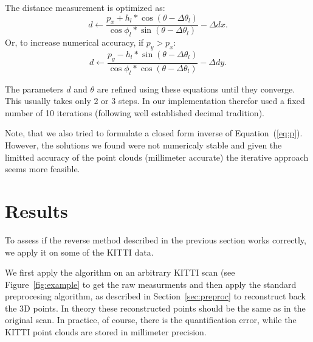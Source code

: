 \documentclass[english]{article}
\begin{document}
The distance measurement is optimized as:
\begin{equation}
    d \leftarrow \frac{p_x + h_l * \cos(\theta - \Delta \theta_l)}{\cos{\phi_l} * \sin(\theta - \Delta \theta_l)} - \Delta dx.  \label{eq:dita}
\end{equation}
Or, to increase numerical accuracy, if $p_y > p_x$:
\begin{equation}
    d \leftarrow \frac{p_y - h_l * \sin(\theta - \Delta \theta_l)}{\cos{\phi_l} * \cos(\theta - \Delta \theta_l)} - \Delta dy.  \label{eq:ditb}
\end{equation}


The parameters $d$ and $\theta$ are refined using these equations until they
converge. This usually takes only 2 or 3 steps. In our implementation therefor
used a fixed number of 10 iterations (following well established decimal
tradition).

Note, that we also tried to formulate a closed form inverse of
Equation~(\ref{eq:p}). However, the solutions we found were not numericaly
stable and given the limitted accuracy of the point clouds (millimeter accurate)
the iterative approach seems more feasible.

\section{Results}
To assess if the reverse method described in the previous section works
correctly, we apply it on some of the KITTI data.

We first apply the algorithm on an arbitrary KITTI scan (see Figure~\ref{fig:example} to get the raw measurments and then
apply the standard preprocesing algorithm, as described in
Section~\ref{sec:preproc} to reconstruct back the 3D points. In theory these
reconstructed points should be the same as in the original scan. In practice, of
course, there is the quantification error, while the KITTI point clouds are
stored in millimeter precision.
\end{document}
